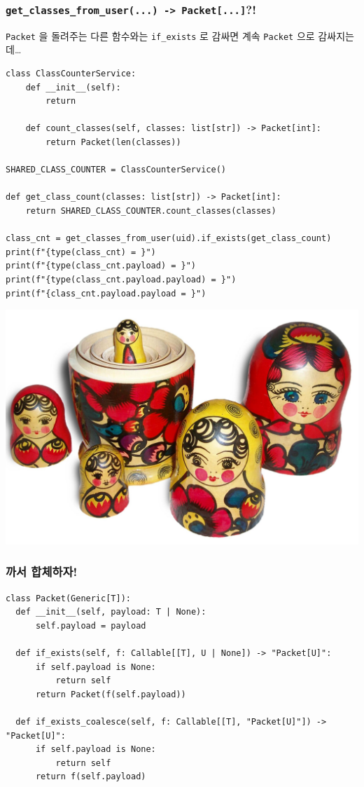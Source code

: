 \documentclass[a4paper,11pt]{article}
\begin{document}
\subsubsection{\texttt{get\_classes\_from\_user(...) -> Packet[...]}?!}
\label{sec:org40b53ed}
\texttt{Packet} 을 돌려주는 다른 함수와는 \texttt{if\_exists} 로 감싸면 계속 \texttt{Packet} 으로 감싸지는데\ldots{}
\begin{verbatim}
class ClassCounterService:
    def __init__(self):
        return

    def count_classes(self, classes: list[str]) -> Packet[int]:
        return Packet(len(classes))

SHARED_CLASS_COUNTER = ClassCounterService()

def get_class_count(classes: list[str]) -> Packet[int]:
    return SHARED_CLASS_COUNTER.count_classes(classes)

class_cnt = get_classes_from_user(uid).if_exists(get_class_count)
print(f"{type(class_cnt) = }")
print(f"{type(class_cnt.payload) = }")
print(f"{type(class_cnt.payload.payload) = }")
print(f"{class_cnt.payload.payload = }")
\end{verbatim}

\begin{center}
\includegraphics[width=.9\linewidth]{./matroshka.jpg}
\end{center}

\subsubsection{까서 합체하자!}
\label{sec:org08c551e}
\begin{verbatim}
class Packet(Generic[T]):
  def __init__(self, payload: T | None):
      self.payload = payload

  def if_exists(self, f: Callable[[T], U | None]) -> "Packet[U]":
      if self.payload is None:
          return self
      return Packet(f(self.payload))

  def if_exists_coalesce(self, f: Callable[[T], "Packet[U]"]) -> "Packet[U]":
      if self.payload is None:
          return self
      return f(self.payload)
\end{verbatim}
\end{document}

